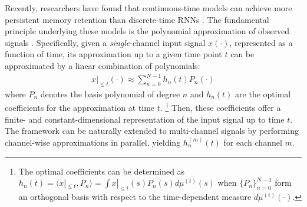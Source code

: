 \documentclass[10pt,letterpaper]{article}
\begin{document}
Recently, researchers have found that continuous-time models can achieve more persistent memory retention than discrete-time RNNs \citep{Zhang+18_FRU,Voelker+19,Gu+20}.
The fundamental principle underlying these models is the polynomial approximation of observed signals \citep[called the \emph{HiPPO} framework;][]{Gu+20}.
Specifically, given a \emph{single}-channel input signal $x(\cdot)$, represented as a function of time, its approximation up to a given time point $t$ can be approximated by a linear combination of polynomials:
\begin{align*}
	x|_{\leq t}(\cdot)%
	\approx \sum_{n=0}^{N-1} h_n(t) P_n(\cdot)
\end{align*}
where $P_n$ denotes the basis polynomial of degree $n$ and $h_n(t)$ are the optimal coefficients for the approximation at time $t$.%
\footnote{
	The optimal coefficients can be determined as $h_n(t) = \langle x|_{\leq t}, P_n \rangle = \int x|_{\leq t}(s) P_n(s) d\mu^{(t)}(s)$ when $\{ P_n \}_{n=0}^{N-1}$ form an orthogonal basis with respect to the time-dependent measure $d\mu^{(t)}(\cdot)$.
}
Then, these coefficients offer a finite- and constant-dimensional representation of the input signal up to time $t$.
The framework can be naturally extended to multi-channel signals by performing channel-wise approximations in parallel, yielding $h_n^{(m)}(t)$ for each channel $m$.
\end{document}
